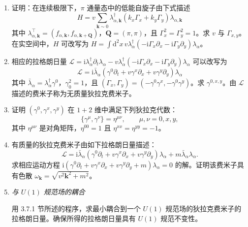 \begin{enumerate}
\item 证明：在连续极限下，$\pi$ 通量态中的低能自旋子由下式描述
\begin{equation*}
H=v\sum_{\pmb{k}\sim0}\lambda^{\dagger}_{\alpha,\pmb{k}}(k_x\Gamma_x+k_y\Gamma_y)\lambda_{\alpha,\pmb{k}}
\end{equation*}
其中 $\lambda^{\top}_{\alpha,\pmb{k}}=(f_{\alpha,\pmb{k}},f_{\alpha,\pmb{k}+\pmb{Q}})$，$\pmb{Q}=(\pi,\pi)$，且 $\Gamma_x^2=\Gamma_y^2=1$。求 $v$ 与 $\Gamma_{x,y}$。在实空间中，$H$ 可改写为 $H=\int\mathrm{d}^2x\,v\lambda^{\dagger}_{\alpha}(-\mathrm{i}\Gamma_x\partial_x-\mathrm{i}\Gamma_y\partial_y)\lambda_{\alpha}$。

\item 相应的拉格朗日量 $\mathcal{L}=\mathrm{i}\lambda^{\dagger}_{\alpha}\partial_t\lambda_{\alpha}-v\lambda^{\dagger}_{\alpha}(-\mathrm{i}\Gamma_x\partial_x-\mathrm{i}\Gamma_y\partial_y)\lambda_{\alpha}$ 可以改写为
\begin{equation*}
\mathcal{L}=\mathrm{i}\bar{\lambda}_{\alpha}(\gamma^0\partial_t+v\gamma^x\partial_x+v\gamma^y\partial_y)\lambda_{\alpha}
\end{equation*}
其中 $\bar{\lambda}_{\alpha}=\lambda^{\dagger}_{\alpha}\gamma^0$，$\gamma_0^2=1$，且 $(\Gamma_x,\Gamma_y)=(-\gamma^0\gamma^x,-\gamma^0\gamma^y)$。求 $\gamma^{0,x,y}$。由 $\mathcal{L}$ 描述的费米子称为无质量狄拉克费米子。

\item 证明 $(\gamma^0,\gamma^x,\gamma^y)$ 在 $1+2$ 维中满足下列狄拉克代数：
\begin{equation*}
\{\gamma^{\mu},\gamma^{\nu}\}=\eta^{\mu\nu},\qquad \mu,\nu=0,x,y,
\end{equation*}
其中 $\eta^{\mu\nu}$ 是对角矩阵，$\eta^{00}=1$ 且 $\eta^{xx}=\eta^{yy}=-1$。

\item 有质量的狄拉克费米子由如下拉格朗日量描述：
\begin{equation*}
\mathcal{L}=\mathrm{i}\bar{\lambda}_{\alpha}(\gamma^0\partial_t+v\gamma^x\partial_x+v\gamma^y\partial_y)\lambda_{\alpha}+m\bar{\lambda}_{\alpha}\lambda_{\alpha}.
\end{equation*}
求相应运动方程 $\mathrm{i}(\gamma^0\partial_t+v\gamma^x\partial_x+v\gamma^y\partial_y+m)\lambda_{\alpha}=0$ 的解。证明该费米子具有色散 $\omega_{\pmb{k}}=\sqrt{v^2\pmb{k}^2+m^2}$。

\item \emph{与 $U(1)$ 规范场的耦合}

用 3.7.1 节所述的程序，求最小耦合到一个 $U(1)$ 规范场的狄拉克费米子的拉格朗日量。确保所得的拉格朗日量具有 $U(1)$ 规范不变性。
\end{enumerate}

